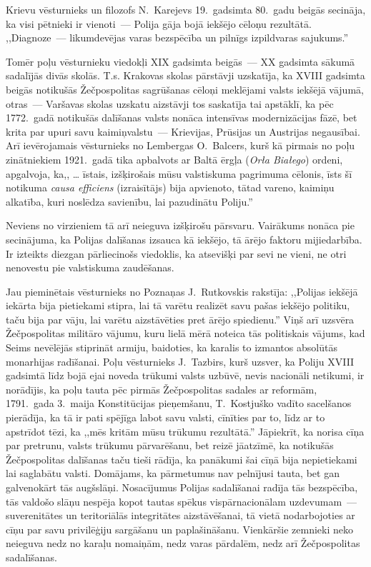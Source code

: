 \documentclass[twoside,a5paper,12pt,fleqn,openany]{extbook}
\newcommand{\pltxti}[1]{\textit{\textpolish{#1}}}
\newcommand{\latxti}[1]{\textit{\textlatin{#1}}}
\begin{document}
Krievu vēsturnieks un filozofs N.~Karejevs 19.~gadsimta 80.~gadu beigās secināja, ka visi pētnieki ir vienoti~--- Polija gāja bojā iekšējo cēloņu rezultātā. ,,Diagnoze~--- likumdevējas varas bezspēcība un pilnīgs izpildvaras sajukums.''

Tomēr poļu vēsturnieku viedokļi XIX gadsimta beigās~--- XX gadsimta sākumā sadalījās divās skolās. T.s. Krakovas skolas pārstāvji uzskatīja, ka XVIII gadsimta beigās notikušās Žečpospolitas sagrūšanas cēloņi meklējami valsts iekšējā vājumā, otras~--- Varšavas skolas uzskatu aizstāvji tos saskatīja tai apstāklī, ka pēc 1772.~gadā notikušās dalīšanas valsts nonāca intensīvas modernizācijas fāzē, bet krita par upuri savu kaimiņvalstu~--- Krievijas, Prūsijas un Austrijas negausībai. Arī ievērojamais vēsturnieks no Lembergas O.~Balcers, kurš kā pirmais no poļu zinātniekiem 1921.~gadā tika apbalvots ar Baltā ērgļa (\pltxti{Orła Białego}) ordeni, apgalvoja, ka,, \dots{} īstais, izšķirošais mūsu valstiskuma pagrimuma cēlonis, īsts šī notikuma \latxti{causa efficiens} (izraisītājs) bija apvienoto, tātad vareno, kaimiņu alkatība, kuri noslēdza savienību, lai pazudinātu Poliju.''

Neviens no virzieniem tā arī neieguva izšķirošu pārsvaru. Vairākums nonāca pie secinājuma, ka Polijas dalīšanas izsauca kā iekšējo, tā ārējo faktoru mijiedarbība. Ir izteikts diezgan pārliecinošs viedoklis, ka atsevišķi par sevi ne vieni, ne otri nenovestu pie valstiskuma zaudēšanas.

Jau pieminētais vēsturnieks no Poznaņas J.~Rutkovskis rakstīja: ,,Polijas iekšējā iekārta bija pietiekami stipra, lai tā varētu realizēt savu pašas iekšējo politiku, taču bija par vāju, lai varētu aizstāvēties pret ārējo spiedienu.'' Viņš arī uzsvēra Žečpospolitas militāro vājumu, kuru lielā mērā noteica tās politiskais vājums, kad Seims nevēlējās stiprināt armiju, baidoties, ka karalis to izmantos absolūtās monarhijas radīšanai. Poļu vēsturnieks J.~Tazbirs, kurš uzsver, ka Poliju XVIII gadsimtā līdz bojā ejai noveda trūkumi valsts uzbūvē, nevis nacionāli netikumi, ir norādījis, ka poļu tauta pēc pirmās Žečpospolitas sadales ar reformām, 1791.~gada 3.~maija Konstitūcijas pieņemšanu, T.~Kostjuško vadīto sacelšanos pierādīja, ka tā ir pati spējīga labot savu valsti, cīnīties par to, līdz ar to apstrīdot tēzi, ka ,,mēs kritām mūsu trūkumu rezultātā.'' Jāpiekrīt, ka norisa cīņa par pretrunu, valsts trūkumu pārvarēšanu, bet reizē jāatzīmē, ka notikušās Žečpospolitas dalīšanas taču tieši rādīja, ka panākumi šai cīņā bija nepietiekami lai saglabātu valsti. Domājams, ka pārmetumus nav pelnījusi tauta, bet gan galvenokārt tās augšslāņi. Nosacījumus Polijas sadalīšanai radīja tās bezspēcība, tās valdošo slāņu nespēja kopot tautas spēkus vispārnacionālam uzdevumam~--- suverenitātes un teritoriālās integritātes aizstāvēšanai, tā vietā nodarbojoties ar cīņu par savu privilēģiju sargāšanu un paplašināšanu. Vienkāršie zemnieki neko neieguva nedz no karaļu nomaiņām, nedz varas pārdalēm, nedz arī Žečpospolitas sadalīšanas.
\end{document}
